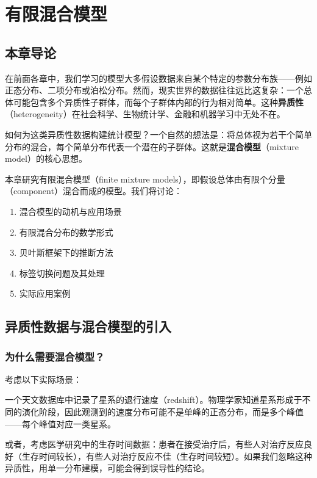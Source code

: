 
\chapter{有限混合模型}

\section{本章导论}

在前面各章中，我们学习的模型大多假设数据来自某个特定的参数分布族——例如正态分布、二项分布或泊松分布。然而，现实世界的数据往往远比这复杂：一个总体可能包含多个异质性子群体，而每个子群体内部的行为相对简单。这种\textbf{异质性}（heterogeneity）在社会科学、生物统计学、金融和机器学习中无处不在。

如何为这类异质性数据构建统计模型？一个自然的想法是：将总体视为若干个简单分布的混合，每个简单分布代表一个潜在的子群体。这就是\textbf{混合模型}（mixture model）的核心思想。

本章研究有限混合模型（finite mixture models），即假设总体由有限个分量（component）混合而成的模型。我们将讨论：
\begin{enumerate}
  \item 混合模型的动机与应用场景
  \item 有限混合分布的数学形式
  \item 贝叶斯框架下的推断方法
  \item 标签切换问题及其处理
  \item 实际应用案例
\end{enumerate}

\section{异质性数据与混合模型的引入}

\subsection{为什么需要混合模型？}

考虑以下实际场景：

一个天文数据库中记录了星系的退行速度（redshift）。物理学家知道星系形成于不同的演化阶段，因此观测到的速度分布可能不是单峰的正态分布，而是多个峰值——每个峰值对应一类星系。

或者，考虑医学研究中的生存时间数据：患者在接受治疗后，有些人对治疗反应良好（生存时间较长），有些人对治疗反应不佳（生存时间较短）。如果我们忽略这种异质性，用单一分布建模，可能会得到误导性的结论。

